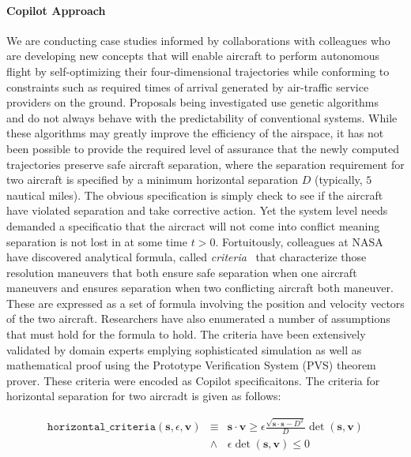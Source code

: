 \paragraph{Copilot Approach} We are conducting case studies informed
by collaborations with colleagues who are developing new concepts that
will enable aircraft to perform autonomous flight by self-optimizing
their four-dimensional trajectories while conforming to constraints
such as required times of arrival generated by air-traffic service
providers on the ground. Proposals being investigated use genetic
algorithms~\cite{KarrVRC} and do not always behave with the
predictability of conventional systems. While these algorithms may
greatly improve the efficiency of the airspace, it has not been
possible to provide the required level of assurance that the newly
computed trajectories preserve safe aircraft separation, where the
separation requirement for two aircraft is specified by a minimum
horizontal separation $D$ (typically, $5$ nautical miles).  The
obvious specification is simply check to see if the aircraft have
violated separation and take corrective action.  Yet the system level
needs demanded a specificatio that the aircract will not come into
conflict meaning separation is not lost in at some time $t>0.$
Fortuitously, colleagues at NASA have discovered analytical formula,
called \emph{criteria}~\cite{NM2011NASA,NMH14ATIO} that characterize
those resolution maneuvers that both ensure safe separation when one
aircraft maneuvers and ensures separation when two conflicting
aircraft both maneuver. These are expressed as a set of formula
involving the position and velocity vectors of the two
aircraft. Researchers have also enumerated a number of assumptions
that must hold for the formula to hold. The criteria have been
extensively validated by domain experts emplying sophisticated
simulation as well as mathematical proof using the Prototype
Verification System (PVS) theorem prover. These criteria were encoded
as Copilot specificaitons. The criteria for horizontal separation for
two aircradt is given as follows:

\begin{eqnarray*} \texttt{horizontal\_criteria}(\bm{s}, \epsilon, \bm{v})
& \equiv &  \bm{s} \cdot \bm{v} \geq \epsilon  \frac{\sqrt{\bm{s} \cdot
  \bm{s}  - D^2}} {D} \operatorname{det}(\bm{s},\bm{v})  \\
& \wedge &  \epsilon \operatorname{det}(\bm{s},\bm{v})  \leq  0 
\end{eqnarray*}


